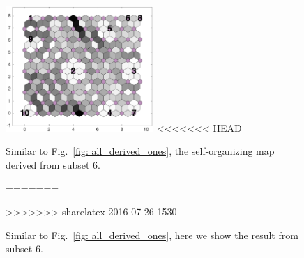 \begin{figure}
        \centering
        \includegraphics[width=0.5\textwidth]{../../images0.01/M31/2D/image_subsets/subset4_dist_with_hits_t.png}
<<<<<<< HEAD
    \caption{Similar to Fig.~\ref{fig: all_derived_ones}, the self-organizing map derived  from subset 6.}
=======
    \caption{Similar to Fig.~\ref{fig: all_derived_ones}, here we show the result from subset 6.}
>>>>>>> sharelatex-2016-07-26-1530
    \label{fig: subset4}
\end{figure}
